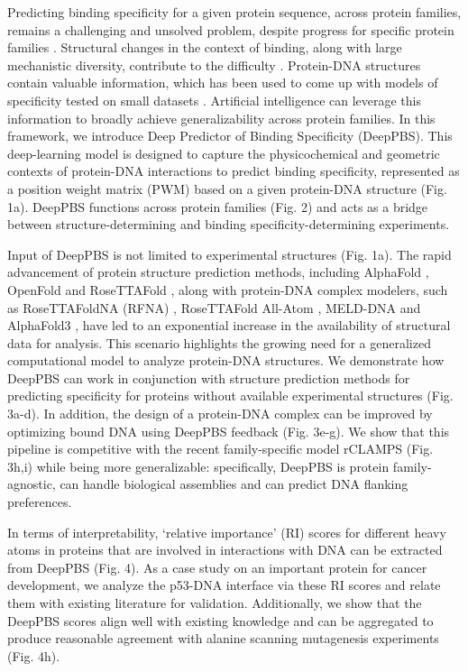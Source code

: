 Predicting binding specificity for a given protein sequence, across protein families, remains a challenging and unsolved problem, despite progress for specific protein families \citep{persikov2014novo, Wetzel2022, persikov2009predicting, Sofia2022, Meseguer2020, molparia2010zif, christensen2012recognition, Yanover2011}. Structural changes in the context of binding, along with large mechanistic diversity, contribute to the difficulty \citep{Slattery2014, Chiu2023}. Protein-DNA structures contain valuable information, which has been used to come up with models of specificity tested on small datasets \citep{morozov2005protein}. Artificial intelligence can leverage this information to broadly achieve generalizability across protein families. In this framework, we introduce Deep Predictor of Binding Specificity (DeepPBS). This deep-learning model is designed to capture the physicochemical and geometric contexts of protein-DNA interactions to predict binding specificity, represented as a position weight matrix (PWM) \citep{Stormo2013} based on a given protein-DNA structure (Fig. 1a). DeepPBS functions across protein families (Fig. 2) and acts as a bridge between structure-determining and binding specificity-determining experiments. 
\par
Input of DeepPBS is not limited to experimental structures (Fig. 1a). The rapid advancement of protein structure prediction methods, including AlphaFold \citep{Jumper2021}, OpenFold \citep{Ahdritz2024} and RoseTTAFold \citep{Baek2021}, along with protein-DNA complex modelers, such as RoseTTAFoldNA (RFNA) \citep{baek2024na}, RoseTTAFold All-Atom \citep{Krishna2024}, MELD-DNA \citep{Esmaeeli2023} and AlphaFold3 \citep{Abramson2024}, have led to an exponential increase in the availability of structural data for analysis. This scenario highlights the growing need for a generalized computational model to analyze protein-DNA structures. We demonstrate how DeepPBS can work in conjunction with structure prediction methods for predicting specificity for proteins without available experimental structures (Fig. 3a-d). In addition, the design of a protein-DNA complex can be improved by optimizing bound DNA using DeepPBS feedback (Fig. 3e-g). We show that this pipeline is competitive with the recent family-specific model rCLAMPS \citep{Wetzel2022} (Fig. 3h,i) while being more generalizable: specifically, DeepPBS is protein family-agnostic, can handle biological assemblies and can predict DNA flanking preferences.
\par
In terms of interpretability, ‘relative importance’ (RI) scores for different heavy atoms in proteins that are involved in interactions with DNA can be extracted from DeepPBS (Fig. 4). As a case study on an important protein for cancer development, we analyze the p53-DNA interface via these RI scores and relate them with existing literature for validation. Additionally, we show that the DeepPBS scores align well with existing knowledge and can be aggregated to produce reasonable agreement with alanine scanning mutagenesis experiments \citep{Morrison2001} (Fig. 4h).
